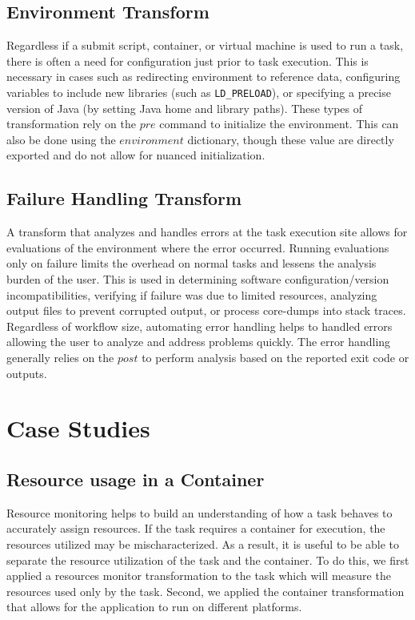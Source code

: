 \documentclass[conference]{IEEEtran}
\begin{document}
\subsection{Environment Transform}

Regardless if a submit script, 
container, or virtual machine 
is used to run a task, 
there is often a need for configuration 
just prior to task execution. 
This is necessary in cases such as
redirecting environment to reference data,
configuring variables to include new libraries
(such as {\tt LD\_PRELOAD}),
or specifying a precise version of Java
(by setting Java home and library paths).
These types of transformation rely on the 
${pre}$ command to initialize the environment. 
This can also be done using
the ${environment}$ dictionary, though these
value are directly exported and do not 
allow for nuanced initialization.

\subsection{Failure Handling Transform}

A transform that analyzes and handles errors at the task execution site
allows for evaluations of the environment where the error occurred.
Running evaluations only on failure limits the overhead 
on normal tasks and lessens the analysis burden of the user.
This is used in 
determining software configuration/version incompatibilities, 
verifying if failure was due to limited resources, 
analyzing output files to prevent corrupted output,
or process core-dumps into stack traces. 
Regardless of workflow size,
automating error handling helps to handled errors
allowing the user to analyze and address problems quickly. 
The error handling generally relies on the $post$ to 
perform analysis based on the reported
exit code or outputs.

\section{Case Studies}


\subsection{Resource usage in a Container}
Resource monitoring helps to build an understanding of how
a task behaves to accurately assign resources. 
If the task requires a container for execution, the 
resources utilized may be mischaracterized. 
As a result, it is useful to be able to separate the
resource utilization of the task and the container.
To do this, we first applied a 
resources monitor transformation to the task
which will measure the resources used only
by the task.
Second, we applied the container transformation
that allows for the application to run on 
different platforms.
\end{document}
